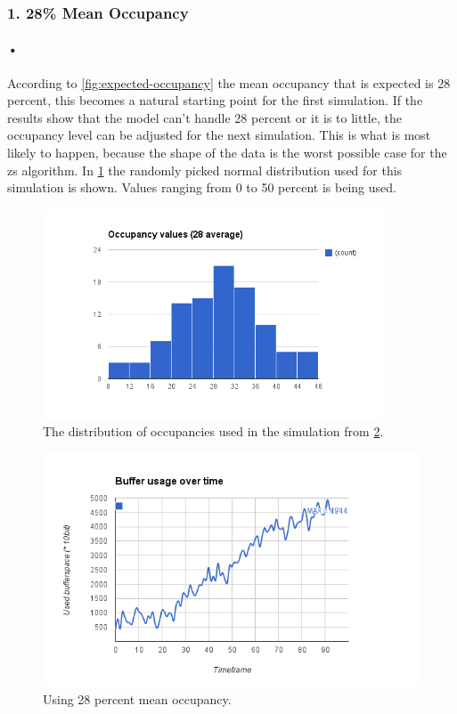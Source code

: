 \documentclass[a4paper, 12pt]{report}
\begin{document}
\subsubsection{1. 28\% Mean Occupancy}

\paragraph{•}
According to \ref{fig:expected-occupancy} the mean occupancy that is expected is 28 percent, this becomes a natural starting point for the first simulation.
If the results show that the model can't handle 28 percent or it is to little, the occupancy level can be adjusted for the next simulation.
This is what is most likely to happen, because the shape of the data is the worst possible case for the \gls{zs} algorithm. 
In \ref{fig:28-dist} the randomly picked normal distribution used for this simulation is shown.
Values ranging from 0 to 50 percent is being used.

\begin{figure}[h!]
	\centering
		\includegraphics[width=0.9\textwidth]{images/occupancy-28.png}
		\caption{The distribution of occupancies used in the simulation from \ref{fig:28-occ}.}
		\label{fig:28-dist}
\end{figure}

\begin{figure}[h!]
	\centering
		\includegraphics[width=1.0\textwidth]{images/mean-28.png}
		\caption{Using 28 percent mean occupancy.}
		\label{fig:28-occ}
\end{figure}
\end{document}
